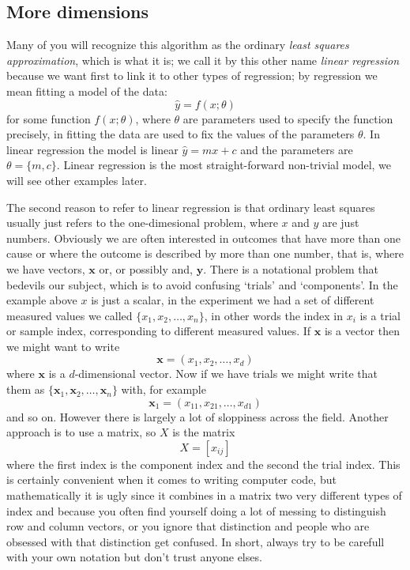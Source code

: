 \documentclass[12pt]{article}
\begin{document}
\subsection*{More dimensions}

Many of you will recognize this algorithm as the ordinary
\textsl{least squares approximation}, which is what it is; we call it
by this other name \textsl{linear regression} because we want first to
link it to other types of regression; by regression we mean fitting a model of the data:
\begin{equation}
  \hat{y}=f(x;\theta)
\end{equation}
for some function $f(x;\theta)$, where $\theta$ are parameters used to
specify the function precisely, in fitting the data are used to fix
the values of the parameters $\theta$. In linear regression the model
is linear $\hat{y}=mx+c$ and the parameters are
$\theta=\{m,c\}$. Linear regression is the most straight-forward
non-trivial model, we will see other examples later.

The second reason to refer to linear regression is that ordinary least
squares usually just refers to the one-dimesional problem, where $x$
and $y$ are just numbers. Obviously we are often interested in
outcomes that have more than one cause or where the outcome is
described by more than one number, that is, where we have vectors,
$\mathbf{x}$ or, or possibly and, $\mathbf{y}$. There is a notational
problem that bedevils our subject, which is to avoid confusing
`trials' and `components'. In the example above $x$ is just a scalar,
in the experiment we had a set of different measured values we called
$\{x_1,x_2,\ldots,x_n\}$, in other words the index in $x_i$ is a
trial or sample index, corresponding to different measured values. If
$\mathbf{x}$ is a vector then we might want to write
\begin{equation}
  \mathbf{x}=(x_1,x_2,\ldots,x_d)
\end{equation}
where $\mathbf{x}$ is a $d$-dimensional vector. Now if we have trials
we might write that them as
$\{\mathbf{x}_1,\mathbf{x}_2,\ldots,\mathbf{x}_n\}$ with, for example
\begin{equation}
  \mathbf{x}_1=(x_{11},x_{21},\ldots,x_{d1})
\end{equation}
and so on. However there is largely a lot of sloppiness across the
field. Another approach is to use a matrix, so $X$ is the matrix
\begin{equation}
  X=[x_{ij}]
\end{equation}
where the first index is the component index and the second the trial
index. This is certainly convenient when it comes to writing computer
code, but mathematically it is ugly since it combines in a matrix two
very different types of index and because you often find yourself
doing a lot of messing to distinguish row and column vectors, or you
ignore that distinction and people who are obsessed with that
distinction get confused. In short, always try to be carefull with
your own notation but don't trust anyone elses.
\end{document}

